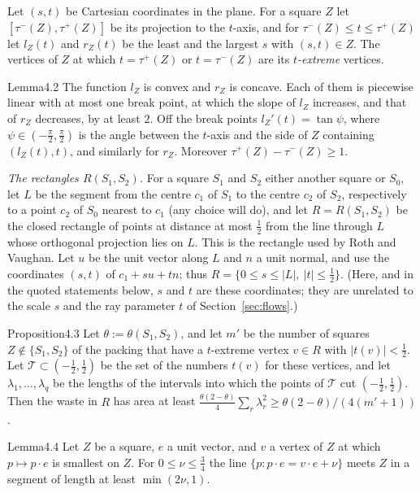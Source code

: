 \documentclass[11pt]{amsart}
\theoremstyle{definition}
\theoremstyle{remark}
\numberwithin{equation}{section}
\begin{document}
Let $(s,t)$ be Cartesian coordinates in the plane. For a square $Z$ let $[\tau^-(Z),\tau^+(Z)]$ be its projection to the
$t$-axis, and for $\tau^-(Z)\le t\le\tau^+(Z)$ let $l_Z(t)$ and $r_Z(t)$ be the least and the largest $s$ with $(s,t)\in Z$.
The vertices of $Z$ at which $t=\tau^+(Z)$ or $t=\tau^-(Z)$ are its \emph{$t$-extreme} vertices.

\begin{ImpStatement}{Lemma}{4.2}\label{imp:L4.2}
The function $l_Z$ is convex and $r_Z$ is concave. Each of them is piecewise linear with at most one break point, at which
the slope of $l_Z$ increases, and that of $r_Z$ decreases, by at least $2$. Off the break points $l_Z'(t)=\tan\psi$, where
$\psi\in(-\frac\pi2,\frac\pi2)$ is the angle between the $t$-axis and the side of $Z$ containing $(l_Z(t),t)$, and similarly
for $r_Z$. Moreover $\tau^+(Z)-\tau^-(Z)\ge1$.
\end{ImpStatement}

\emph{The rectangles $R(S_1,S_2)$.}
For a square $S_1$ and $S_2$ either another square or $S_0$, let
$L$ be the segment from the centre $c_1$ of $S_1$ to the centre $c_2$ of $S_2$, respectively to a point $c_2$ of $S_0$ nearest to
$c_1$ (any choice will do), and let $R=R(S_1,S_2)$ be the closed rectangle of points at distance at most $\frac12$ from the line through $L$ whose
orthogonal projection lies on $L$. This is the rectangle used by Roth and Vaughan. Let $u$ be the unit vector along $L$
and $n$ a unit normal, and use the coordinates $(s,t)$ of $c_1+su+tn$; thus $R=\{0\le s\le|L|,\ |t|\le\frac12\}$. (Here, and in the quoted
statements below, $s$ and $t$ are these coordinates; they are unrelated to the scale $s$ and the ray parameter $t$ of
Section~\ref{sec:flows}.)

\begin{ImpStatement}{Proposition}{4.3}\label{imp:P4.3}
Let $\theta:=\theta(S_1,S_2)$, and let $m'$ be the number of squares $Z\notin\{S_1,S_2\}$ of the packing that have a
$t$-extreme vertex $v\in R$ with $|t(v)|<\frac12$. Let $\mathcal T\subset(-\frac12,\frac12)$ be the set of the numbers $t(v)$
for these vertices, and let $\lambda_1,\dots,\lambda_q$ be the lengths of the intervals into which the points of $\mathcal T$
cut $(-\frac12,\frac12)$. Then the waste in $R$ has area at least
$\frac{\theta(2-\theta)}4\sum_r\lambda_r^2\ge\theta(2-\theta)/(4(m'+1))$.
\end{ImpStatement}

\begin{ImpStatement}{Lemma}{4.4}\label{imp:L4.4}
Let $Z$ be a square, $e$ a unit vector, and $v$ a vertex of $Z$ at which $p\mapsto p\cdot e$ is smallest on $Z$. For
$0\le\nu\le\frac34$ the line $\{p:p\cdot e=v\cdot e+\nu\}$ meets $Z$ in a segment of length at least $\min(2\nu,1)$.
\end{ImpStatement}
\end{document}
